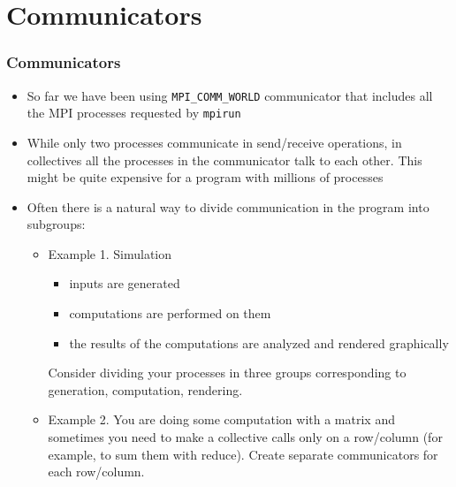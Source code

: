 \documentclass{beamer}
\begin{document}
\section{Communicators}
\begin{frame}[fragile]
  \frametitle{Communicators}
\begin{itemize}
\item So far we have been using  {\color{mycolorcode}\verb|MPI_COMM_WORLD|} communicator that includes all the MPI processes requested by {\color{mycolorcli}\verb|mpirun|}
\item While only two processes communicate in send/receive operations, in collectives all the processes in the communicator talk to each other. This might be quite expensive for a program with millions of processes
\item Often there is a natural way to divide communication in the program into subgroups:
\begin{itemize}
\item Example 1. Simulation 
\begin{itemize}
\item inputs are generated
\item computations are performed on them
\item the results of the computations are analyzed and rendered graphically
\end{itemize}
Consider dividing your processes in three groups corresponding to generation, computation, rendering.
\item Example 2. You are doing some computation with a matrix and sometimes you need to make a collective calls only on a row/column (for example, to sum them with reduce). Create separate communicators for each row/column.
\end{itemize}
\end{itemize}
\end{frame}
\end{document}
